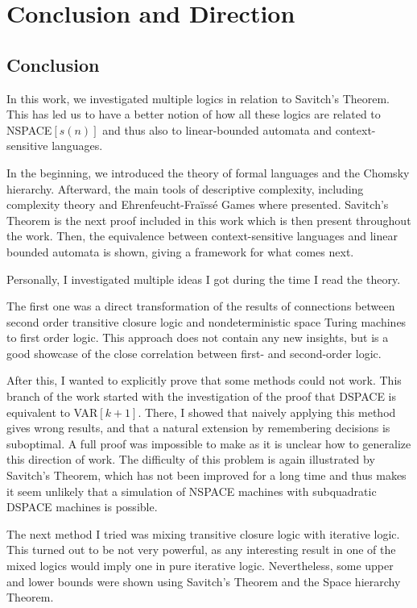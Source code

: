 \chapter{Conclusion and Direction}\label{ch:conclusion-and-direction}

\section{Conclusion}\label{sec:conclusion}
In this work, we investigated multiple logics in relation to Savitch's Theorem.
This has led us to have a better notion of how all these logics are related to NSPACE$[s(n)]$ and thus also to linear-bounded automata and context-sensitive languages.

In the beginning, we introduced the theory of formal languages and the Chomsky hierarchy.
Afterward, the main tools of descriptive complexity, including complexity theory and Ehrenfeucht-Fraïssé Games where presented.
Savitch's Theorem is the next proof included in this work which is then present throughout the work.
Then, the equivalence between context-sensitive languages and linear bounded automata is shown, giving a framework for what comes next.

Personally, I investigated multiple ideas I got during the time I read the theory.

The first one was a direct transformation of the results of connections between second order transitive closure logic and nondeterministic space Turing machines to first order logic.
This approach does not contain any new insights, but is a good showcase of the close correlation between first- and second-order logic.

After this, I wanted to explicitly prove that some methods could not work.
This branch of the work started with the investigation of the proof that DSPACE is equivalent to VAR$[k + 1]$.
There, I showed that naively applying this method gives wrong results, and that a natural extension by remembering decisions is suboptimal.
A full proof was impossible to make as it is unclear how to generalize this direction of work.
The difficulty of this problem is again illustrated by Savitch's Theorem, which has not been improved for a long time and thus makes it seem unlikely that a simulation of NSPACE machines with subquadratic DSPACE machines is possible.

The next method I tried was mixing transitive closure logic with iterative logic.
This turned out to be not very powerful, as any interesting result in one of the mixed logics would imply one in pure iterative logic.
Nevertheless, some upper and lower bounds were shown using Savitch's Theorem and the Space hierarchy Theorem.

